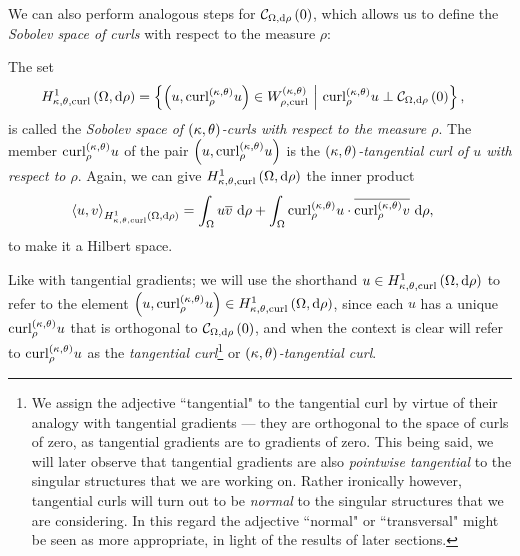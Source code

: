 We can also perform analogous steps for $\mathcal{C}_{ \Omega, \mathrm{d}\rho}\left( 0 \right)$, which allows us to define the \emph{Sobolev space of curls} with respect to the measure $\rho$:
\begin{definition} \label{def:CurlSobSpace}
	The set
	\begin{align*}
		H^1_{\kappa,\theta,\mathrm{curl}}\left( \Omega, \mathrm{d}\rho \right) &= \left\{  \left( u, \mathrm{curl}_{\rho}^{\left( \kappa, \theta \right)}u \right)\in W^{\left( \kappa, \theta \right)}_{\rho,\mathrm{curl}} \ \middle\vert \  \mathrm{curl}_{\rho}^{\left( \kappa, \theta \right)}u \perp \mathcal{C}_{ \Omega, \mathrm{d}\rho}\left( 0 \right)  \right\},
	\end{align*}
	is called the \emph{Sobolev space of $\left( \kappa, \theta \right)$-curls with respect to the measure $\rho$}.
	The member $\mathrm{curl}_{\rho}^{\left( \kappa, \theta \right)}u$ of the pair $\left( u, \mathrm{curl}_{\rho}^{\left( \kappa, \theta \right)}u \right)$ is the \emph{$\left( \kappa, \theta \right)$-tangential curl of $u$ with respect to $\rho$}.
	Again, we can give $H^1_{\kappa,\theta,\mathrm{curl}}\left( \Omega, \mathrm{d}\rho \right)$ the inner product
	\begin{align*}
		\left\langle u , v \right\rangle_{H^1_{\kappa,\theta,\mathrm{curl}}\left( \Omega, \mathrm{d}\rho \right)} 
		&= \int_{\Omega}u\overline{v} \ \mathrm{d}\rho
		+ \int_{\Omega}\mathrm{curl}_{\rho}^{\left( \kappa, \theta \right)}u \cdot \overline{\mathrm{curl}_{\rho}^{\left( \kappa, \theta \right)}v} \ \mathrm{d}\rho,
	\end{align*}
	to make it a Hilbert space.
\end{definition}
Like with tangential gradients; we will use the shorthand $u\in H^1_{\kappa,\theta,\mathrm{curl}}\left( \Omega, \mathrm{d}\rho \right)$ to refer to the element $\left( u, \mathrm{curl}_{\rho}^{\left( \kappa, \theta \right)}u \right)\in H^1_{\kappa,\theta,\mathrm{curl}}\left( \Omega, \mathrm{d}\rho \right)$, since each $u$ has a unique $\mathrm{curl}_{\rho}^{\left( \kappa, \theta \right)}u$ that is orthogonal to $\mathcal{C}_{ \Omega, \mathrm{d}\rho}\left( 0 \right)$, and when the context is clear will refer to $\mathrm{curl}_{\rho}^{\left( \kappa, \theta \right)}u$ as the \emph{tangential curl}\footnote{We assign the adjective ``tangential" to the tangential curl by virtue of their analogy with tangential gradients --- they are orthogonal to the space of curls of zero, as tangential gradients are to gradients of zero.
This being said, we will later observe that tangential gradients are also \emph{pointwise tangential} to the singular structures that we are working on.
Rather ironically however, tangential curls will turn out to be \emph{normal} to the singular structures that we are considering.
In this regard the adjective ``normal" or ``transversal" might be seen as more appropriate, in light of the results of later sections.}
or \emph{$\left( \kappa, \theta \right)$-tangential curl}.

